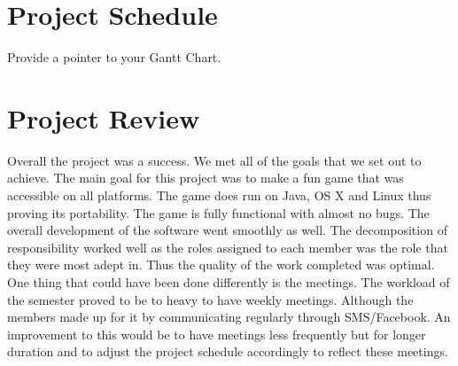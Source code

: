 \documentclass{article}
\begin{document}
\section{Project Schedule}
Provide a pointer to your Gantt Chart.

\section{Project Review}
Overall the project was a success. We met all of the goals that we set out to achieve. The main goal for this project was to make a fun game that was accessible on all platforms. The game does run on Java, OS X and Linux thus proving its portability.  The game is fully functional with almost no bugs. The overall development of the software went smoothly as well. The decomposition of responsibility worked well as the roles assigned to each member was the role that they were most adept in. Thus the quality of the work completed was optimal. One thing that could have been done differently is the meetings. The workload of the semester proved to be to heavy to have weekly meetings. Although the members made up for it by communicating regularly through SMS/Facebook. An improvement to this would be to have meetings less frequently but for longer duration and to adjust the project schedule accordingly to reflect these meetings.
\end{document}
